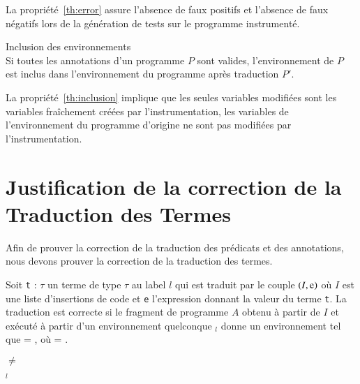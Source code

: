 La propriété~\ref{th:error} assure l'absence de faux positifs et l'absence de
faux négatifs lors de la génération de tests sur le programme instrumenté.

\begin{property}{Inclusion des environnements}\label{th:inclusion}~\\
  Si toutes les annotations d'un programme $P$ sont valides, l'environnement de
  $P$ est inclus dans l'environnement du programme après traduction $P'$.
\end{property}


La propriété~\ref{th:inclusion} implique que les seules variables modifiées sont
les variables fraîchement créées par l'instrumentation, les variables de
l'environnement du programme d'origine ne sont pas modifiées par
l'instrumentation.


\section{Justification de la correction de la Traduction des Termes}
\label{sec:term-translation}

Afin de prouver la correction de la traduction des prédicats et des annotations,
nous devons prouver la correction de la traduction des termes.

\begin{property}
  \label{lem:term-correct}
  Soit \lstinline't' : $\tau$ un terme de type $\tau$ au label $l$ qui est
  traduit par le couple $(I, \mbox{\lstinline'e'})$ où $I$ est une liste
  d'insertions de code et \lstinline'e' l'expression donnant la valeur du terme
  \lstinline't'.
  La traduction est correcte si le fragment de programme $A$ obtenu à partir de
  $I$ et exécuté à partir d'un environnement quelconque \env$_l$ donne un
  environnement \env{} tel que
   = , où
  \env = .
\end{property}

\begin{property}
  \label{lem:term-noerror}
  \env $\neq$ \errorenv
\end{property}

\begin{property}
  \label{lem:term-subset}
  \env$_l$ \subenv{} \env
\end{property}

